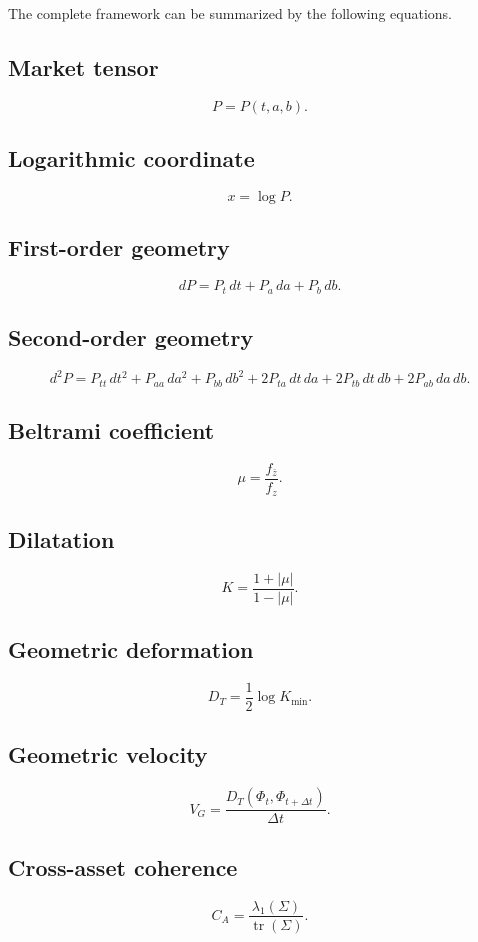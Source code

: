 \documentclass[11pt,a4paper]{article}
\numberwithin{equation}{section}
\newcommand{\tr}{\operatorname{tr}}
\newcommand{\abs}[1]{\left|#1\right|}
\begin{document}
The complete framework can be summarized by the following equations.

\subsection*{Market tensor}
\[
P=P(t,a,b).
\]

\subsection*{Logarithmic coordinate}
\[
x=\log P.
\]

\subsection*{First-order geometry}
\[
dP=P_t\,dt+P_a\,da+P_b\,db.
\]

\subsection*{Second-order geometry}
\[
d^2P=P_{tt}\,dt^2+P_{aa}\,da^2+P_{bb}\,db^2
+2P_{ta}\,dt\,da+2P_{tb}\,dt\,db+2P_{ab}\,da\,db.
\]

\subsection*{Beltrami coefficient}
\[
\mu=\frac{f_{\bar z}}{f_z}.
\]

\subsection*{Dilatation}
\[
K=\frac{1+\abs{\mu}}{1-\abs{\mu}}.
\]

\subsection*{Geometric deformation}
\[
D_T=\frac12\log K_{\min}.
\]

\subsection*{Geometric velocity}
\[
V_G=\frac{D_T(\Phi_t,\Phi_{t+\Delta t})}{\Delta t}.
\]

\subsection*{Cross-asset coherence}
\[
C_A=\frac{\lambda_1(\Sigma)}{\tr(\Sigma)}.
\]
\end{document}
